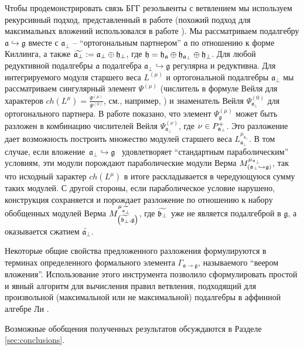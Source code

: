 \documentclass[12pt]{article}
\theoremstyle{definition}
\newcommand{\gf}{\mathfrak{g}}
\newcommand{\af}{\mathfrak{a}}
\newcommand{\afb}{\mathfrak{a}_{\bot}}
\begin{document}
Чтобы продемонстрировать связь БГГ резольвенты с ветвлением мы используем рекурсивный подход, представленный в работе \cite
{2010arXiv1007.0318L} (похожий подход для максимальных вложений использовался в работе \cite{ilyin812pbc}). Мы рассматриваем подалгебру $\af \hookrightarrow \gf$ вместе с $\afb$ -- ``ортогональным партнером'' $\af$ по отношению к форме Киллинга, а также  $\widetilde{\afb}:=\afb\oplus \frak{h}_{\perp }$, где $\frak{h}=\frak{\frak{h}_{\af}}\oplus
\frak{h}_{\afb}\oplus \frak{h}_{\perp }$. Для любой редуктивной подалгебры $\af$ подалгебра $\afb\hookrightarrow \gf$ регулярна и редуктивна. Для интегрируемого модуля старшего веса $%
L^{\left(\mu \right) }$ и ортогональной подалгебры  $\af_{\bot }$ мы рассматриваем сингулярный элемент $\Psi ^{\left( \mu \right) }$ (числитель в формуле Вейля для характеров $ch\left( L^{\mu }\right) =\frac{\Psi ^{\left(
\mu \right) }}{\Psi ^{\left( 0\right) }}$, см., например,  \cite
{humphreys1997introduction}) и знаменатель Вейля $\Psi _{\af_{\bot
  }}^{\left( 0\right) }$ для ортогонального партнера. В работе показано, что элемент  $\Psi _{\gf%
}^{\left( \mu \right) }$ может быть разложен в комбинацию числителей Вейля $\Psi _{\af_{\bot }}^{\left( \nu \right) }$, где $\nu \in P_{%
\mathfrak{a}_{\bot}}^{+}$. Это разложение дает возможность построить множество модулей старшего веса $L_{\afb}%
^{\mu _{\afb}}$. В том случае, если вложение\ $\af%
_{\bot }\hookrightarrow \gf$ \ удовлетворяет ``стандартным параболическим'' условиям, эти модули порождают параболические модули Верма $M_{\left(
\afb \hookrightarrow \gf\right) }^{\mu _{%
\afb}}$, так что исходный характер $ch\left(
L^{\mu }\right) $ в итоге раскладывается в чередующуюся сумму таких модулей. С другой стороны, если параболическое условие нарушено, конструкция сохраняется и порождает разложение по отношению к набору обобщенных модулей Верма  $M_{\left( \widetilde{\frak{b}_{\perp }},\gf\right) }^{\mu _{%
\widetilde{\afb}}}$, где $%
\widetilde{\frak{b}_{\perp }}$ уже не является подалгеброй в $\gf$, а оказывается сжатием $\widetilde{\afb}$.

Некоторые общие свойства предложенного разложения формулируются в терминах определенного формального элемента $\Gamma _{\af\rightarrow \gf}$, называемого ``веером вложения''. Использование этого инструмента позволило сформулировать простой и явный алгоритм для вычисления правил ветвления, подходящий для произвольной (максимальной или не максимальной) подалгебры в аффинной алгебре Ли \cite{2010arXiv1007.0318L}.

Возможные обобщения полученных результатов обсуждаются в Разделе \ref{sec:conclusions}.
\end{document}
